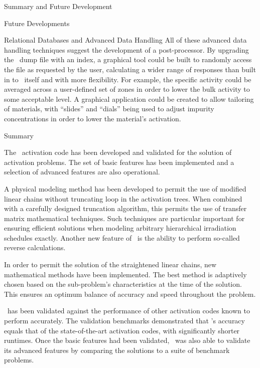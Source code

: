 \begin{chapter}{Summary and Future Development}
\begin{section}{Future Developments}
\begin{subsection}{Relational Databases and Advanced Data Handling}
      All of these advanced data handling techniques suggest the
      development of a post-processor.  By upgrading the \ALARA\ dump
      file with an index, a graphical tool could be built to randomly
      access the file as requested by the user, calculating a wider
      range of responses than built in to \ALARA\ itself and with more
      flexibility.  For example, the specific activity could be
      averaged across a user-defined set of zones in order to lower
      the bulk activity to some acceptable level.  A graphical
      application could be created to allow tailoring of materials,
      with ``slides'' and ``dials'' being used to adjust impurity
      concentrations in order to lower the material's activation.
    \end{subsection}

  \end{section}
  
  \begin{section}{Summary}
    
    The \ALARA\  activation code has been developed and validated for
    the solution of activation problems.  The set of basic features
    has been implemented and a selection of advanced features are also
    operational.  
    
    A physical modeling method has been developed to permit the use of
    modified linear chains without truncating loop in the activation
    trees.  When combined with a carefully designed truncation
    algorithm, this permits the use of transfer matrix mathematical
    techniques.  Such techniques are particular important for ensuring
    efficient solutions when modeling arbitrary hierarchical
    irradiation schedules exactly.  Another new feature of \ALARA\  is
    the ability to perform so-called reverse calculations.
    
    In order to permit the solution of the straightened linear chains,
    new mathematical methods have been implemented.  The best method
    is adaptively chosen based on the sub-problem's characteristics at
    the time of the solution.  This ensures an optimum balance of
    accuracy and speed throughout the problem.
    
    \ALARA\  has been validated against the performance of other
    activation codes known to perform accurately.  The validation
    benchmarks demonstrated that \ALARA's accuracy equals that of the
    state-of-the-art activation codes, with significantly shorter
    runtimes.  Once the basic features had been validated, \ALARA\  was
    also able to validate its advanced features by comparing the
    solutions to a suite of benchmark problems.
    

\end{section}
\end{chapter}

